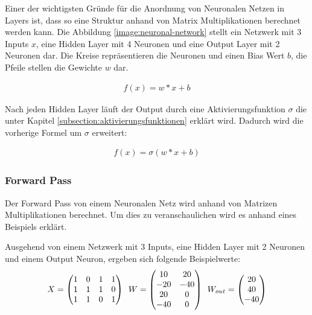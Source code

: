 Einer der wichtigsten Gründe für die Anordnung von Neuronalen Netzen in Layers ist, dass so eine Struktur anhand von Matrix Multiplikationen
berechnet werden kann. Die Abbildung \ref{image:neuronal-network} stellt ein Netzwerk mit 3 Inputs $ x $, eine Hidden Layer mit 4 Neuronen
und eine Output Layer mit 2 Neuronen dar. Die Kreise repräsentieren die Neuronen und einen Bias Wert $ b $,
die Pfeile stellen die Gewichte $ w $ dar.

\begin{align}
  f(x) = w*x + b
\end{align}

Nach jeden Hidden Layer läuft der Output durch eine Aktivierungsfunktion $ \sigma $ die unter Kapitel \ref{subsection:aktivierungsfunktionen} erklärt wird.
Dadurch wird die vorherige Formel um $ \sigma $ erweitert:

\begin{align}
  f(x) = \sigma( w*x + b)
\end{align}

\subsubsection{Forward Pass}
Der Forward Pass von einem Neuronalen Netz wird anhand von Matrizen Multiplikationen berechnet. Um dies zu veranschaulichen wird
es anhand eines Beispiels erklärt.

Ausgehend von einem Netzwerk mit 3 Inputs, eine Hidden Layer mit 2 Neuronen und einem Output Neuron, ergeben sich folgende Beispielwerte:
\begin{equation} 
  \vspace{5pt}
  X = \begin{pmatrix}
    1 &0 &1 &1 \\
    1 &1 &1 &0 \\
    1 &1 &0 &1
  \end{pmatrix} 
  \hspace{5pt}
  W = \begin{pmatrix}
    10 &20 \\
    -20 &-40 \\
    20 &0 \\
    -40 &0
  \end{pmatrix}
  \hspace{5pt}
  W_{out} = \begin{pmatrix}
    20 \\
    40 \\
    -40
  \end{pmatrix}
\end{equation}

